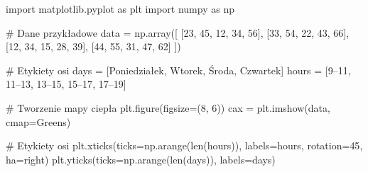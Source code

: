 \documentclass[
  polish,
  letterpaper,
  DIV=11,
  numbers=noendperiod]{scrreprt}
\newenvironment{Shaded}{\begin{snugshade}}{\end{snugshade}}
\newcommand{\BuiltInTok}[1]{\textcolor[rgb]{0.00,0.23,0.31}{#1}}
\newcommand{\CommentTok}[1]{\textcolor[rgb]{0.37,0.37,0.37}{#1}}
\newcommand{\DecValTok}[1]{\textcolor[rgb]{0.68,0.00,0.00}{#1}}
\newcommand{\ImportTok}[1]{\textcolor[rgb]{0.00,0.46,0.62}{#1}}
\newcommand{\NormalTok}[1]{\textcolor[rgb]{0.00,0.23,0.31}{#1}}
\newcommand{\OperatorTok}[1]{\textcolor[rgb]{0.37,0.37,0.37}{#1}}
\newcommand{\StringTok}[1]{\textcolor[rgb]{0.13,0.47,0.30}{#1}}
\begin{document}
\begin{Shaded}
\begin{Highlighting}[]
\ImportTok{import}\NormalTok{ matplotlib.pyplot }\ImportTok{as}\NormalTok{ plt}
\ImportTok{import}\NormalTok{ numpy }\ImportTok{as}\NormalTok{ np}

\CommentTok{\# Dane przykładowe}
\NormalTok{data }\OperatorTok{=}\NormalTok{ np.array([}
\NormalTok{    [}\DecValTok{23}\NormalTok{, }\DecValTok{45}\NormalTok{, }\DecValTok{12}\NormalTok{, }\DecValTok{34}\NormalTok{, }\DecValTok{56}\NormalTok{],}
\NormalTok{    [}\DecValTok{33}\NormalTok{, }\DecValTok{54}\NormalTok{, }\DecValTok{22}\NormalTok{, }\DecValTok{43}\NormalTok{, }\DecValTok{66}\NormalTok{],}
\NormalTok{    [}\DecValTok{12}\NormalTok{, }\DecValTok{34}\NormalTok{, }\DecValTok{15}\NormalTok{, }\DecValTok{28}\NormalTok{, }\DecValTok{39}\NormalTok{],}
\NormalTok{    [}\DecValTok{44}\NormalTok{, }\DecValTok{55}\NormalTok{, }\DecValTok{31}\NormalTok{, }\DecValTok{47}\NormalTok{, }\DecValTok{62}\NormalTok{]}
\NormalTok{])}

\CommentTok{\# Etykiety osi}
\NormalTok{days }\OperatorTok{=}\NormalTok{ [}\StringTok{\textquotesingle{}Poniedziałek\textquotesingle{}}\NormalTok{, }\StringTok{\textquotesingle{}Wtorek\textquotesingle{}}\NormalTok{, }\StringTok{\textquotesingle{}Środa\textquotesingle{}}\NormalTok{, }\StringTok{\textquotesingle{}Czwartek\textquotesingle{}}\NormalTok{]}
\NormalTok{hours }\OperatorTok{=}\NormalTok{ [}\StringTok{\textquotesingle{}9–11\textquotesingle{}}\NormalTok{, }\StringTok{\textquotesingle{}11–13\textquotesingle{}}\NormalTok{, }\StringTok{\textquotesingle{}13–15\textquotesingle{}}\NormalTok{, }\StringTok{\textquotesingle{}15–17\textquotesingle{}}\NormalTok{, }\StringTok{\textquotesingle{}17–19\textquotesingle{}}\NormalTok{]}

\CommentTok{\# Tworzenie mapy ciepła}
\NormalTok{plt.figure(figsize}\OperatorTok{=}\NormalTok{(}\DecValTok{8}\NormalTok{, }\DecValTok{6}\NormalTok{))}
\NormalTok{cax }\OperatorTok{=}\NormalTok{ plt.imshow(data, cmap}\OperatorTok{=}\StringTok{\textquotesingle{}Greens\textquotesingle{}}\NormalTok{)}

\CommentTok{\# Etykiety osi}
\NormalTok{plt.xticks(ticks}\OperatorTok{=}\NormalTok{np.arange(}\BuiltInTok{len}\NormalTok{(hours)), labels}\OperatorTok{=}\NormalTok{hours, rotation}\OperatorTok{=}\DecValTok{45}\NormalTok{, ha}\OperatorTok{=}\StringTok{\textquotesingle{}right\textquotesingle{}}\NormalTok{)}
\NormalTok{plt.yticks(ticks}\OperatorTok{=}\NormalTok{np.arange(}\BuiltInTok{len}\NormalTok{(days)), labels}\OperatorTok{=}\NormalTok{days)}


\end{Highlighting}
\end{Shaded}
\end{document}
